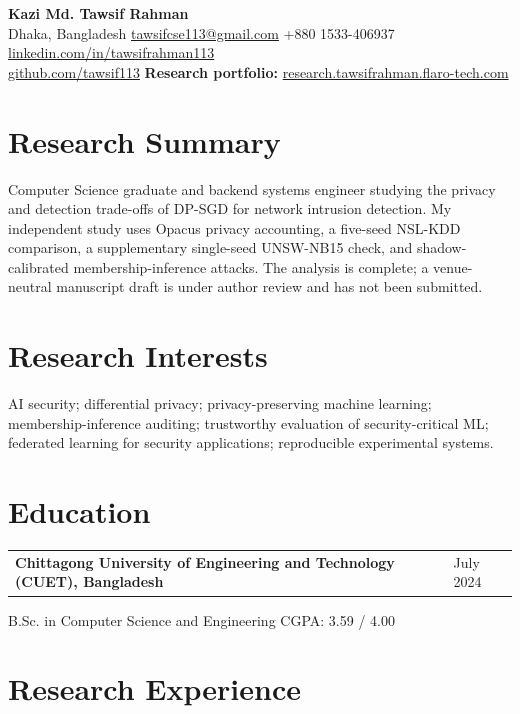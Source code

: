 \documentclass[11pt,letterpaper]{article}
\makeatletter
\newcommand{\entry}[2]{%
  \begin{tabularx}{\textwidth}{@{}X >{\raggedleft\arraybackslash}p{0.19\textwidth}@{}}
    \textbf{#1} & #2
  \end{tabularx}\par
}
\makeatother
\begin{document}
{\LARGE\bfseries Kazi Md. Tawsif Rahman}\\[2pt]
Dhaka, Bangladesh \enspace\textbar\enspace
\href{mailto:tawsifcse113@gmail.com}{tawsifcse113@gmail.com} \enspace\textbar\enspace
+880 1533-406937 \enspace\textbar\enspace
\href{https://linkedin.com/in/tawsifrahman113}{linkedin.com/in/tawsifrahman113}\\
\href{https://github.com/tawsif113}{github.com/tawsif113} \enspace\textbar\enspace
\textbf{Research portfolio:}
\href{https://research.tawsifrahman.flaro-tech.com/}{research.tawsifrahman.flaro-tech.com}

\section*{Research Summary}

Computer Science graduate and backend systems engineer studying the privacy and
detection trade-offs of DP-SGD for network intrusion detection. My independent
study uses Opacus privacy accounting, a five-seed NSL-KDD comparison, a
supplementary single-seed UNSW-NB15 check, and shadow-calibrated
membership-inference attacks. The analysis is complete; a venue-neutral
manuscript draft is under author review and has not been submitted.

\section*{Research Interests}

AI security; differential privacy; privacy-preserving machine learning;
membership-inference auditing; trustworthy evaluation of security-critical ML;
federated learning for security applications; reproducible experimental systems.

\section*{Education}

\entry{Chittagong University of Engineering and Technology (CUET), Bangladesh}{July 2024}
B.Sc. in Computer Science and Engineering \hfill CGPA: 3.59 / 4.00

\section*{Research Experience}
\end{document}
